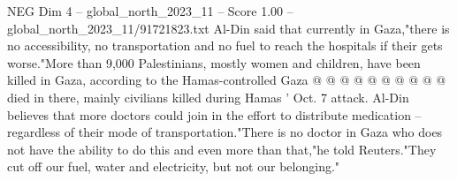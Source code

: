 \begin{textsample}{NEG Dim 4 – global\_north\_2023\_11 – Score 1.00 – global\_north\_2023\_11/91721823.txt}
Al-Din said that currently in Gaza,"there is no accessibility, no transportation and no fuel to reach the hospitals if their gets worse."More than 9,000 Palestinians, mostly women and children, have been killed in Gaza, according to the Hamas-controlled Gaza @ @ @ @ @ @ @ @ @ @ died in there, mainly civilians killed during Hamas ' Oct. 7 attack.
Al-Din believes that more doctors could join in the effort to distribute medication -- regardless of their mode of transportation."There is no doctor in Gaza who does not have the ability to do this and even more than that,"he told Reuters."They cut off our fuel, water and electricity, but not our belonging."

\end{textsample}
